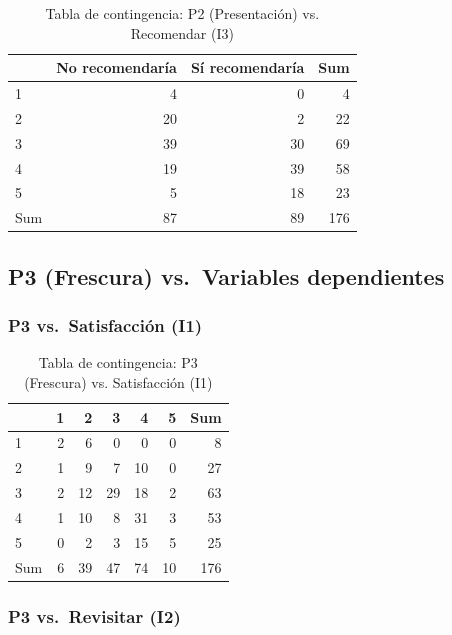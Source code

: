 \documentclass[
  spanish,
]{article}
\begin{document}
\begin{table}[!h]
\centering
\caption{\label{tab:cont-p2-recom}Tabla de contingencia: P2 (Presentación) vs. Recomendar (I3)}
\centering
\begin{tabular}[t]{lrrr}
\toprule
  & No recomendaría & Sí recomendaría & Sum\\
\midrule
1 & 4 & 0 & 4\\
2 & 20 & 2 & 22\\
3 & 39 & 30 & 69\\
4 & 19 & 39 & 58\\
5 & 5 & 18 & 23\\
\addlinespace
Sum & 87 & 89 & 176\\
\bottomrule
\end{tabular}
\end{table}

\subsection{P3 (Frescura) vs.~Variables
dependientes}\label{p3-frescura-vs.-variables-dependientes}

\subsubsection{P3 vs.~Satisfacción
(I1)}\label{p3-vs.-satisfacciuxf3n-i1}

\begin{table}[!h]
\centering
\caption{\label{tab:cont-p3-satisf}Tabla de contingencia: P3 (Frescura) vs. Satisfacción (I1)}
\centering
\begin{tabular}[t]{lrrrrrr}
\toprule
  & 1 & 2 & 3 & 4 & 5 & Sum\\
\midrule
1 & 2 & 6 & 0 & 0 & 0 & 8\\
2 & 1 & 9 & 7 & 10 & 0 & 27\\
3 & 2 & 12 & 29 & 18 & 2 & 63\\
4 & 1 & 10 & 8 & 31 & 3 & 53\\
5 & 0 & 2 & 3 & 15 & 5 & 25\\
\addlinespace
Sum & 6 & 39 & 47 & 74 & 10 & 176\\
\bottomrule
\end{tabular}
\end{table}

\subsubsection{P3 vs.~Revisitar (I2)}\label{p3-vs.-revisitar-i2}
\end{document}

